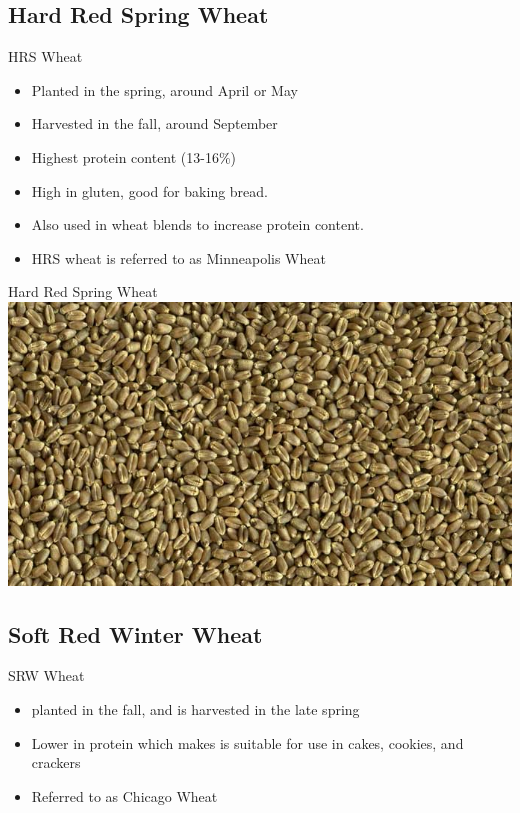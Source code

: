 \documentclass{beamer}
\begin{document}
\subsection{Hard Red Spring Wheat}

\begin{frame}{HRS Wheat}
\begin{itemize}
\item Planted in the spring, around April or May
\item Harvested in the fall, around September
\item Highest protein content (13-16\%)
\item High in gluten, good for baking bread.
\item Also used in wheat blends to increase protein content.
\item HRS wheat is referred to as Minneapolis Wheat
\end{itemize}
\end{frame}

\begin{frame}{Hard Red Spring Wheat}
\includegraphics[width=.75\textwidth]{HRS-Wheat.jpg}
\end{frame}

\subsection{Soft Red Winter Wheat}

\begin{frame}{SRW Wheat}
\begin{itemize}
\item planted in the fall, and is harvested in the late spring
\item Lower in protein which makes is suitable for use in cakes, cookies, and crackers
\item Referred to as Chicago Wheat
\end{itemize}
\end{frame}
\end{document}
